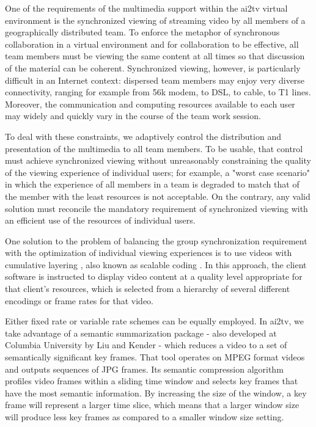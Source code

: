 \documentclass{sig-alternate}
\begin{document}
One of the requirements of the multimedia support within the ai2tv
virtual environment is the synchronized viewing of streaming video by
all members of a geographically distributed team.  To enforce the
metaphor of synchronous collaboration in a virtual environment and for
collaboration to be effective, all team members must be viewing the
same content at all times so that discussion of the material can be
coherent.  Synchronized viewing, however, is particularly difficult in
an Internet context: dispersed team members may enjoy very diverse
connectivity, ranging for example from 56k modem, to DSL, to cable, to
T1 lines.  Moreover, the communication and computing resources
available to each user may widely and quickly vary in the course of
the team work session.

To deal with these constraints, we adaptively control the distribution
and presentation of the multimedia to all team members.  To be usable,
that control must achieve synchronized viewing without unreasonably
constraining the quality of the viewing experience of individual
users; for example, a "worst case scenario" in which the experience of
all members in a team is degraded to match that of the member with the
least resources is not acceptable. On the contrary, any valid solution
must reconcile the mandatory requirement of synchronized viewing with
an efficient use of the resources of individual users.

One solution to the problem of balancing the group synchronization
requirement with the optimization of individual viewing experiences is
to use videos with cumulative layering \cite{MCCANNE}, also known as
scalable coding \cite{LI}.  In this approach, the client software is
instructed to display video content at a quality level appropriate for
that client's resources, which is selected from a hierarchy of several
different encodings or frame rates for that video.

Either fixed rate or variable rate schemes can be equally employed. In
ai2tv, we take advantage of a semantic summarization package - also
developed at Columbia University by Liu and Kender \cite{TIECHENG} -
which reduces a video to a set of semantically significant key frames.
That tool operates on MPEG format videos and outputs sequences of JPG
frames.  Its semantic compression algorithm profiles video frames
within a sliding time window and selects key frames that have the most
semantic information.  By increasing the size of the window, a key
frame will represent a larger time slice, which means that a larger
window size will produce less key frames as compared to a smaller
window size setting.  
\end{document}
